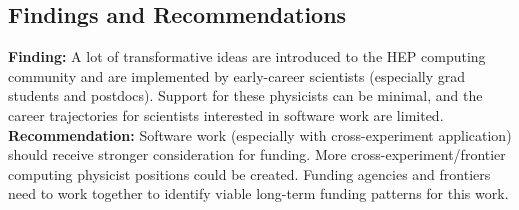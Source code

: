 \begin{comment}
\subsection{Personnel support case studies}
\paragraph{PDG}
The PDG is recognized as important despite not being innovative.  We all expect the PDG to be there.

\paragraph{ROOT}
They don't have funding cycles? \cite{Naumann:2022pub}

\paragraph{XSEDE ACCESS ECSS/SGCI}

The SGCI funding model is based on the XSEDE ECSS program.

\paragraph{CTEQ}

\end{comment}

\subsection{Findings and Recommendations}
\textbf{Finding:} A lot of transformative ideas are introduced to the HEP computing community and are implemented by early-career scientists (especially grad students and postdocs). Support for these physicists can be minimal, and the career trajectories for scientists interested in software work are limited.\\
\textbf{Recommendation:} Software work (especially with cross-experiment application) should receive stronger consideration for funding. More cross-experiment/frontier computing physicist positions could be created.  Funding agencies and frontiers need to work together to identify viable long-term funding patterns for this work.


